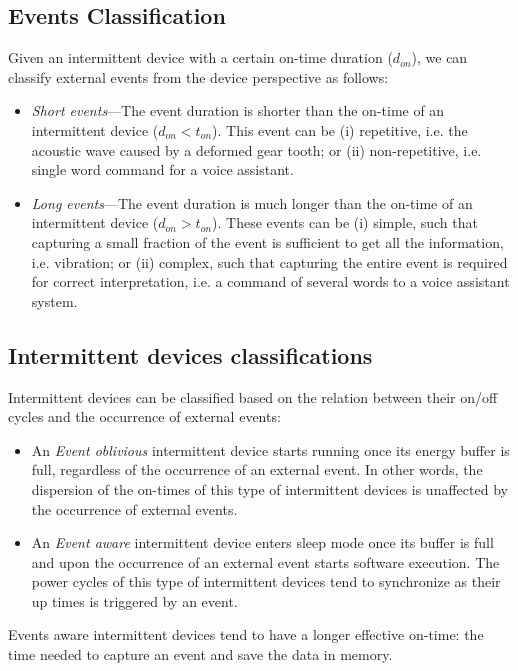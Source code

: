 \subsection{Events Classification}

Given an intermittent device with a certain on-time duration ($d_{on}$), we can classify external events from the device perspective as follows:
\begin{itemize}
		\item \textit{Short events}---The event duration is shorter than the on-time of an intermittent device ($d_{on} < t_{on}$). This event can be (i) repetitive, i.e. the acoustic wave caused by a deformed gear tooth; or (ii) non-repetitive, i.e. single word command for a voice assistant.  

		\item \textit{Long events}---The event duration is much longer than the on-time of an intermittent device ($d_{on} > t_{on} $). These events can be (i) simple, such that capturing a small fraction of the event is sufficient to get all the information, i.e. vibration; or (ii) complex, such that capturing the entire event is required for correct interpretation, i.e. a command of several words to a voice assistant system. 
\end{itemize}

\subsection{Intermittent devices classifications}
Intermittent devices can be classified based on the relation between their on/off cycles and the occurrence of external events:  
\begin{itemize}
		\item An \textit{Event oblivious} intermittent device starts running once its energy buffer is full, regardless of the occurrence of an external event. In other words, the dispersion of the on-times of this type of intermittent devices is unaffected by the occurrence of external events. 
		\item An \textit{Event aware} intermittent device enters sleep mode once its buffer is full and upon the occurrence of an external event starts software execution. The power cycles of this type of intermittent devices tend to synchronize as their up times is triggered by an event.  

\end{itemize}

Events aware intermittent devices tend to have a longer effective on-time: the time needed to capture an event and save the data in memory.
%
%


